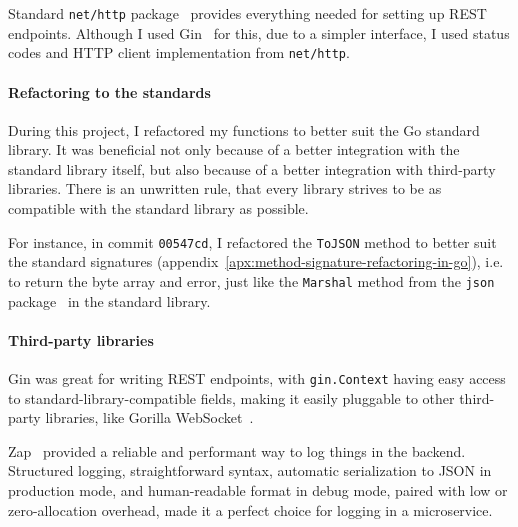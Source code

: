 Standard \texttt{net/http} package~\cite{cox_http_2022} provides everything
needed for setting up \ac{REST} endpoints.
Although I used Gin~\cite{martinez-almeida_gin_2022} for this,
due to a simpler interface,
I used status codes
and \ac{HTTP} client implementation
from \texttt{net/http}.

\paragraph{Refactoring to the standards}\label{sec:refactoring-to-the-standards}

During this project,
I refactored my functions to better suit
the Go standard library.
It was beneficial
not only because of a better integration
with the standard library itself,
but also because of a better integration
with third-party libraries.
There is an unwritten rule,
that every library strives
to be as compatible
with the standard library as possible.

For instance,
in commit \texttt{00547cd},
I refactored the \texttt{ToJSON} method
to better suit the standard signatures
(appendix~\ref{apx:method-signature-refactoring-in-go}),
i.e. to return the byte array and error,
just like the \texttt{Marshal} method
from the \texttt{json} package~\cite{cox_json_2022}
in the standard library.

\paragraph{Third-party libraries}\label{sec:third-party-libraries}

Gin was great for writing \ac{REST} endpoints,
with \texttt{gin.Context} having easy access to
standard-library-compatible fields,
making it easily pluggable to other third-party libraries,
like Gorilla WebSocket~\cite{burd_gorilla_2022}.

Zap~\cite{shah_zap_2022} provided a reliable
and performant way to log things in the backend.
Structured logging,
straightforward syntax,
automatic serialization to \ac{JSON} in production mode,
and human-readable format in debug mode,
paired with low or zero-allocation overhead,
made it a perfect choice for logging in a microservice.

